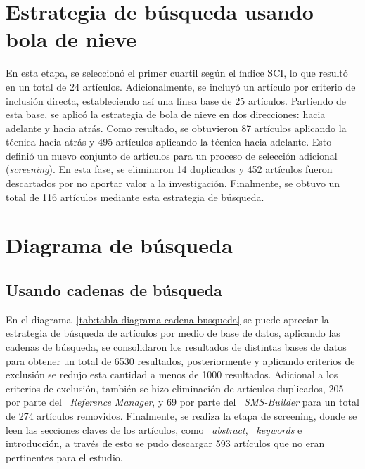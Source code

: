\section{Estrategia de búsqueda usando bola de nieve}\label{sec:bolaDeNieve}
\noindent
En esta etapa, se seleccionó el primer cuartil según el índice SCI, lo que resultó en un total de 24 artículos. Adicionalmente, se incluyó un artículo por criterio de inclusión directa, estableciendo así una línea base de 25 artículos. 
Partiendo de esta base, se aplicó la estrategia de bola de nieve en dos direcciones: hacia adelante y hacia atrás. Como resultado, se obtuvieron 87 artículos aplicando la técnica hacia atrás y 495 artículos aplicando la técnica hacia adelante.
Esto definió un nuevo conjunto de artículos para un proceso de selección adicional (\textit{screening}). En esta fase, se eliminaron 14 duplicados y 452 artículos fueron descartados por no aportar valor a la investigación.
Finalmente, se obtuvo un total de 116 artículos mediante esta estrategia de búsqueda.

\section{Diagrama de búsqueda}\label{sec:diagramaBusqueda}

\subsection{Usando cadenas de búsqueda}
\noindent
En el diagrama~\ref{tab:tabla-diagrama-cadena-busqueda} se puede apreciar la estrategia de búsqueda de artículos por medio de base de datos, aplicando las cadenas de búsqueda, se consolidaron los resultados de distintas bases de datos para obtener un total de 6530 resultados, posteriormente y aplicando criterios de exclusión se redujo esta cantidad a menos de 1000 resultados. Adicional a los criterios de exclusión, también se hizo eliminación de artículos duplicados, 205 por parte del ~\textit{Reference Manager}, y 69 por parte del ~\textit{SMS-Builder} para un total de 274 artículos removidos. Finalmente, se realiza la etapa de screening, donde se leen las secciones claves de los artículos, como ~\textit{abstract}, ~\textit{keywords} e introducción, a través de esto se pudo descargar 593 artículos que no eran pertinentes para el estudio.
\label{img:busqueda-bd}

